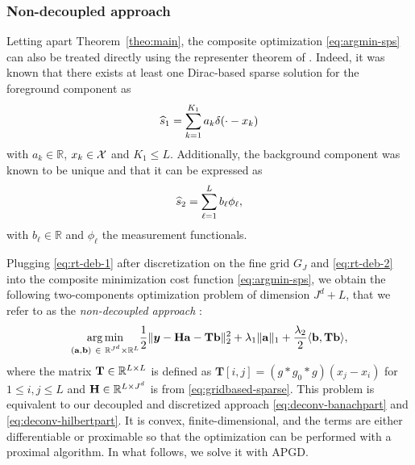 \documentclass[12pt]{article}
\begin{document}
        \subsubsection{Non-decoupled approach}
        Letting apart Theorem~\ref{theo:main}, the composite optimization \eqref{eq:argmin-sps} can also be treated directly using the representer theorem of \cite{debarre2021continuous}. Indeed, it was known that there exists at least one Dirac-based sparse solution for the foreground component as
        \begin{equation}
            \widehat{s}_1 = \sum_{k=1}^{K_1} a_{k} \delta(\cdot - x_k)
            \label{eq:rt-deb-1}
        \end{equation}
        with $a_{k} \in \mathbb{R}$, $x_k \in \mathcal{X}$ and $K_1 \leq L$.
        Additionally, the background component was known to be unique and that it can be expressed as
        \begin{equation}
            \widehat{s}_2 = \sum_{\ell=1}^{L} b_{\ell} \phi_\ell,
            \label{eq:rt-deb-2}
        \end{equation}
        with $b_\ell \in \mathbb{R}$ and $\phi_\ell$ the measurement functionals.

        Plugging \eqref{eq:rt-deb-1} after discretization on the fine grid $G_J$ and \eqref{eq:rt-deb-2} into the composite minimization cost function \eqref{eq:argmin-sps}, we obtain the following two-components optimization problem of dimension $J^d + L$, that we refer to as the \emph{non-decoupled approach} :
        \begin{equation}
        \label{eq:ndcp-argmin}
            \underset{(\mathbf{a}, \mathbf{b})\ \in\ \mathbb{R}^{J^d} \times \mathbb{R}^L}{\arg\min} \frac{1}{2} \| \bm{y} - \mathbf{Ha} - \mathbf{Tb} \|_2^2  + \lambda_{1} \| \mathbf{a} \|_1 + \frac{\lambda_{2}}{2} \langle \mathbf{b}, \mathbf{Tb} \rangle,
        \end{equation}
        where the matrix $\mathbf{T} \in \mathbb{R}^{L \times L}$ is defined as
        $\mathbf{T}[i, j] = (g * g_0 * g)(x_j - x_i)$ for $1 \leq i, j \leq L$
        and $\mathbf{H} \in \mathbb{R}^{L\times J^d}$ is from \eqref{eq:gridbased-sparse}.
        This problem is equivalent to our decoupled and discretized approach \eqref{eq:deconv-banachpart} and \eqref{eq:deconv-hilbertpart}. It is convex, finite-dimensional, and the terms are either differentiable or proximable so that the optimization can be performed with a proximal algorithm. In what follows, we solve it with APGD.
    
\end{document}
